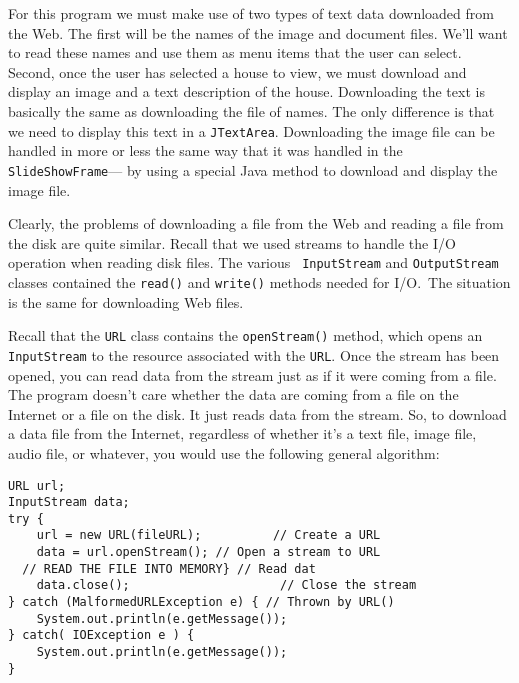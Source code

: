 For this program we must make use of two types of text data downloaded from
the Web.  The first will be the names of the image and document files.
We'll want to read these names and use them as menu items that the
user can select.  Second, once the user has selected a house to view,
we must download and display an image and a text description of the
house.  Downloading the text is basically the same as downloading the
file of names.  The only difference is that we need to display this
text in a {\tt JTextArea}.  Downloading the image file can be handled
in more or less the same way that it was handled in the {\tt
SlideShowFrame}--- by using a special Java method to download and
display the image file.

Clearly, the problems of downloading a file from the Web and reading a
file from the disk are quite similar.  Recall that we used streams to
handle the I/O operation when reading disk files.  The various {\tt
InputStream} and {\tt OutputStream} classes contained the {\tt read()}
and {\tt write()} methods needed for I/O.~The situation is the same
for downloading Web files.

Recall that the {\tt URL} class contains the {\tt openStream()}
method, which opens an {\tt InputStream} to the resource associated
with the {\tt URL}. Once the stream has been opened, you can read data
from the stream just as if it were coming from a file.  The program
doesn't care whether the data are coming from a file on the Internet or
a file on the disk.  It just reads data from the stream.  So, to
download a data file from the Internet, regardless of whether it's a
text file, image file, audio file, or whatever, you would use the
following general algorithm:

\begin{jjjlisting}
\begin{lstlisting}
URL url;
InputStream data;
try {
    url = new URL(fileURL);          // Create a URL
    data = url.openStream(); // Open a stream to URL
  // READ THE FILE INTO MEMORY} // Read dat
    data.close();                     // Close the stream
} catch (MalformedURLException e) { // Thrown by URL()
    System.out.println(e.getMessage());
} catch( IOException e ) { 
    System.out.println(e.getMessage());
}
\end{lstlisting}
\end{jjjlisting}

